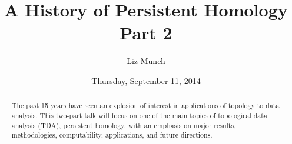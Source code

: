 \documentclass{UAmathtalk}
\author{Liz Munch}
\title{A History of Persistent Homology\\Part 2}
\date{Thursday, September 11, 2014}
\begin{document}
\maketitle

\begin{abstract}
The past 15 years have seen an explosion of interest in applications of topology to data analysis.
This two-part talk will focus on one of the main topics of topological data analysis (TDA), persistent homology, with an emphasis on major results, methodologies, computability, applications, and future directions.
\end{abstract}
\end{document}
